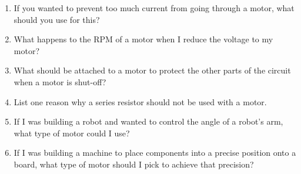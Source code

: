 
\begin{enumerate}
\item If you wanted to prevent too much current from going through a motor, what should you use for this?
\item What happens to the RPM of a motor when I reduce the voltage to my motor?
\item What should be attached to a motor to protect the other parts of the circuit when a motor is shut-off?
\item List one reason why a series resistor should not be used with a motor.
\item If I was building a robot and wanted to control the angle of a robot's arm, what type of motor could I use?
\item If I was building a machine to place components into a precise position onto a board, what type of motor should I pick to achieve that precision?
\end{enumerate}
